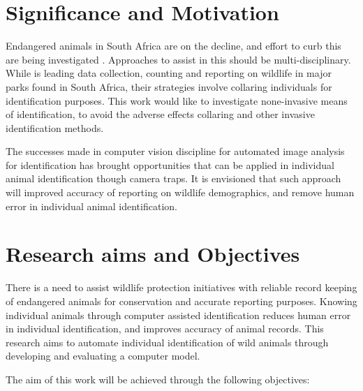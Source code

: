 \section{Significance and Motivation}
Endangered  animals in South Africa are on the decline, and effort to curb this are being investigated \cite{marnewick2008evaluating}. Approaches to assist in this should be  multi-disciplinary. While \citeauthor{marnewick2018cheetaprob} \citeyear{marnewick2018cheetaprob} \cite{marnewick2018cheetaprob} is leading data collection, counting and reporting on wildlife in major parks found in South Africa, their strategies involve collaring individuals for identification purposes. 
This work would like to investigate none-invasive means of identification, to avoid the adverse effects collaring and other invasive identification methods. 

The successes made in computer vision discipline for automated image analysis for identification has brought opportunities that can be applied in individual animal identification though camera traps. It is envisioned that such approach will improved accuracy of reporting on wildlife demographics, and remove human error in individual animal identification. 

\section{Research  aims  and Objectives}
There is a need to assist wildlife protection initiatives with reliable record keeping of endangered animals for conservation and accurate reporting purposes. Knowing individual animals through computer assisted identification reduces human error in individual identification, and improves accuracy of animal records. This research aims to automate individual identification of wild animals through developing and evaluating a computer model. 

The aim of this work will be achieved through the following objectives: 

